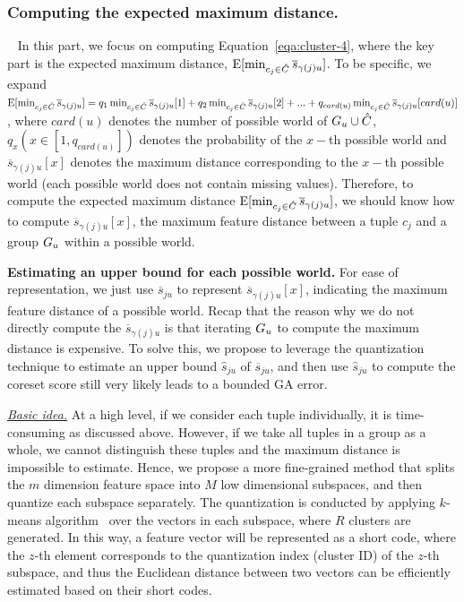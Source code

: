 \subsubsection{Computing the expected maximum distance.}~\label{subsec:pq} In this part, we focus on computing Equation~\ref{eqa:cluster-4}, where the key part is the expected maximum distance, \ie $\mathrm{E}[\min_{c_j\in \hat{C}}\overline{s}_{\gamma(j)u}]$. To be specific, we expand $\mathrm{E}[\min_{c_j\in \hat{C}}\overline{s}_{\gamma(j)u}] = q_1\min_{c_j\in \hat{C}}\overline{s}_{\gamma(j)u}[1] + q_2\min_{c_j\in \hat{C}}\overline{s}_{\gamma(j)u}[2] + ... +q_{card(u)}\min_{c_j\in \hat{C}}\overline{s}_{\gamma(j)u}[card(u)]$, where $card(u)$ denotes the number of possible world of $G_u \cup \hat{C}$, $q_x    (x\in [1, q_{card(u)}])$ denotes the probability of the $x-$th possible world and  $\overline{s}_{\gamma(j)u}[x]$ denotes the maximum distance  corresponding to the $x-$th possible world (each possible world does not contain missing values). 
%
%
%
Therefore, to compute the expected maximum distance $\mathrm{E}[\min_{c_j\in \hat{C}}\overline{s}_{\gamma(j)u}]$, we should know how to compute $\overline{s}_{\gamma(j)u}[x]$, \ie the  maximum feature distance between a tuple $c_j$ and a group $G_u$ within a possible world.

\noindent \textbf{Estimating an upper bound for each possible world.} 
For ease of representation, we just use $\overline{s}_{ju}$ to represent  $\overline{s}_{\gamma(j)u}[x]$, indicating the maximum feature distance of a possible world.
%
%
 Recap that the reason why we do not directly compute the  $\overline{s}_{\gamma(j)u}$ is that iterating $G_u$ to compute the maximum distance is expensive.
  To solve this, we propose to leverage the  quantization technique to estimate an upper bound $\hat{s}_{ju}$ of $\overline{s}_{ju}$, and then use $\hat{s}_{ju}$ to compute the coreset score still very likely leads to a bounded GA error.
  
  \noindent  \underline{\textit{Basic idea.}} 
  At a high level, if we consider each tuple individually, it is time-consuming as discussed above. However, if we take all tuples in a group as a whole, we cannot distinguish these tuples and the maximum distance is impossible to estimate. Hence, we propose a more fine-grained  method that  splits the $m$ dimension feature space into  $M$ low dimensional subspaces, and then quantize each subspace separately.  
 The quantization is conducted by applying $k$-means algorithm~\cite{hartigan1979algorithm} over the vectors in each subspace, where $R$ clusters are generated.  
  In this way, a feature vector will be represented as a short code, where the $z$-th element corresponds to the quantization index (\ie cluster ID) of the $z$-th subspace, and thus the Euclidean distance between two vectors can be efficiently estimated based on their short codes. 
  

